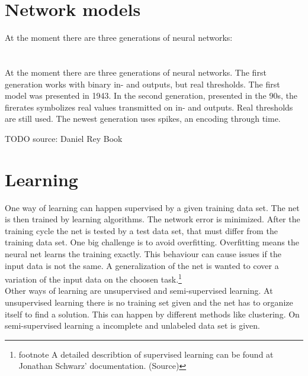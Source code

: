 \documentclass[10pt,a4paper,DIV=11]{scrreprt}
\begin{document}
\section{Network models}
At the moment there are three generations of neural networks: \\


   \\
\\

At the moment there are three generations of neural networks. 
The first generation works with binary in- and outputs, but real thresholds. The first model was presented in 1943.
In the second generation, presented in the 90s, the firerates symbolizes real values transmitted on in- and outputs. Real thresholds are still used.
The newest generation uses spikes, an encoding through time.


TODO source: Daniel Rey Book


\section{Learning}
One way of learning can happen supervised by a given training data set. The net is then trained by learning algorithms. The network error is minimized. After the training cycle the net is tested by a test data set, that must differ from the training data set. One big challenge is to avoid overfitting. Overfitting means the neural net learns the training exactly. This behaviour can cause issues if the input data is not the same. A generalization of the net is wanted to cover a variation of the input data on the choosen task.\footnote{footnote A detailed describtion of supervised learning can be found at Jonathan Schwarz' documentation. (Source)} \\

Other ways of learning are unsupervised and semi-supervised learning. At unsupervised learning there is no training set given and the net has to organize itself to find a solution. This can happen by different methods like clustering. On semi-supervised learning a incomplete and unlabeled data set is given. \\
\end{document}
